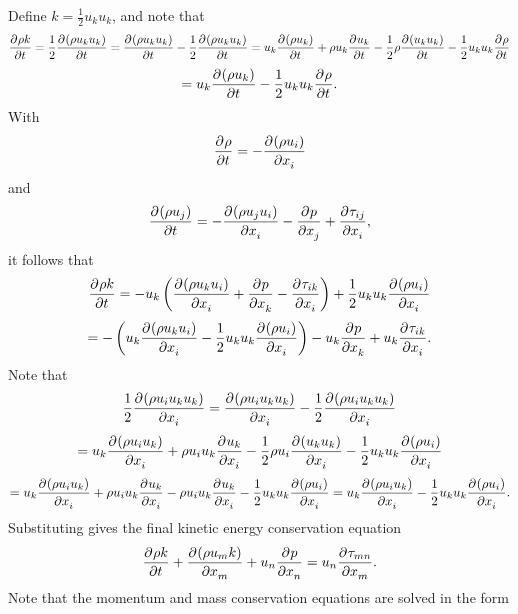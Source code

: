 \documentclass[12pt]{article}
\numberwithin{equation}{section}
\numberwithin{figure}{section}
\begin{document}
Define $k = \frac{1}{2}u_ku_k$, and note that
\begin{equation*}
\pdv{\rho k}{t} = \frac{1}{2}\pdv{(\rho u_ku_k)}{t} = \pdv{(\rho u_ku_k)}{t} - \frac{1}{2}\pdv{(\rho u_ku_k)}{t}
= u_k\pdv{(\rho u_k)}{t} + \rho u_k\pdv{u_k}{t} - \frac{1}{2}\rho \pdv{(u_ku_k)}{t} - \frac{1}{2}u_ku_k\pdv{\rho}{t}
\end{equation*}
\begin{equation}\label{eq::ident}
= u_k\pdv{(\rho u_k)}{t} - \frac{1}{2}u_ku_k\pdv{\rho}{t}.
\end{equation}
With
\begin{equation}
\pdv{\rho}{t} = -\pdv{(\rho u_i)}{x_i}
\end{equation}
and
\begin{equation}
\pdv{(\rho u_j)}{t} = -\pdv{(\rho u_j u_i)}{x_i} - \pdv{p}{x_j} + \pdv{\tau_{ij}}{x_i},
\end{equation}
it follows that
\begin{equation*}
\pdv{\rho k}{t} = -u_k\left(\pdv{(\rho u_k u_i)}{x_i} + \pdv{p}{x_k} - \pdv{\tau_{ik}}{x_i}\right) + \frac{1}{2}u_ku_k\pdv{(\rho u_i)}{x_i}
\end{equation*}
\begin{equation}
= - \left(u_k\pdv{(\rho u_k u_i)}{x_i} - \frac{1}{2}u_ku_k\pdv{(\rho u_i)}{x_i}\right) - u_k\pdv{p}{x_k} + u_k\pdv{\tau_{ik}}{x_i}.
\end{equation}
Note that
\begin{equation*}
\frac{1}{2}\pdv{(\rho u_i u_ku_k)}{x_i} = \pdv{(\rho u_i u_ku_k)}{x_i} - \frac{1}{2}\pdv{(\rho u_i u_ku_k)}{x_i}
\end{equation*}
\begin{equation*}
= u_k\pdv{(\rho u_i u_k)}{x_i} + \rho u_i u_k\pdv{u_k}{x_i} - \frac{1}{2}\rho u_i \pdv{(u_ku_k)}{x_i} - \frac{1}{2}u_ku_k\pdv{(\rho u_i)}{x_i}
\end{equation*}
\begin{equation}
= u_k\pdv{(\rho u_i u_k)}{x_i} + \rho u_i u_k\pdv{u_k}{x_i} - \rho u_i u_k \pdv{u_k}{x_i} - \frac{1}{2}u_ku_k\pdv{(\rho u_i)}{x_i}
= u_k\pdv{(\rho u_i u_k)}{x_i} - \frac{1}{2}u_ku_k\pdv{(\rho u_i)}{x_i}.
\end{equation}
Substituting gives the final kinetic energy conservation equation
\begin{equation}\label{eq::kcons}
\pdv{\rho k}{t} + \pdv{(\rho u_m k)}{x_m} + u_n\pdv{p}{x_n} = u_n\pdv{\tau_{mn}}{x_m}.
\end{equation}
Note that the momentum and mass conservation equations are solved in the form
\end{document}
